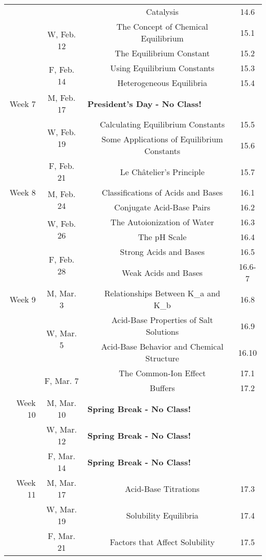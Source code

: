 \begin{tabular}{rcccc}
& & & Catalysis & 14.6\\
& \multirow{2}{*}{W, Feb. 12}& & The Concept of Chemical Equilibrium & 15.1\\
& & & The Equilibrium Constant & 15.2\\
& \multirow{2}{*}{F, Feb. 14}& & Using Equilibrium Constants & 15.3\\
& & & Heterogeneous Equilibria & 15.4\\
\midrule
Week 7 & M, Feb. 17& \multicolumn{3}{l}{\textbf{President's Day - No Class!}}\\
& \multirow{2}{*}{W, Feb. 19}& & Calculating Equilibrium Constants & 15.5\\
& & & Some Applications of Equilibrium Constants & 15.6\\
& F, Feb. 21&& Le Ch\^atelier's Principle & 15.7\\
\midrule
Week 8 & \multirow{2}{*}{M, Feb. 24}& & Classifications of Acids and Bases & 16.1\\
& & & Conjugate Acid-Base Pairs & 16.2\\
& \multirow{2}{*}{W, Feb. 26}& & The Autoionization of Water & 16.3\\
& & & The pH Scale & 16.4\\
& \multirow{2}{*}{F, Feb. 28}& & Strong Acids and Bases & 16.5\\
& & & Weak Acids and Bases & 16.6-7\\
\midrule
Week 9 & M, Mar. 3&& Relationships Between K_a and K_b & 16.8\\
& \multirow{2}{*}{W, Mar. 5}& & Acid-Base Properties of Salt Solutions & 16.9\\
& & & Acid-Base Behavior and Chemical Structure & 16.10\\
& \multirow{2}{*}{F, Mar. 7}& & The Common-Ion Effect & 17.1\\
& & & Buffers & 17.2\\
\midrule
Week 10 & M, Mar. 10& \multicolumn{3}{l}{\textbf{Spring Break - No Class!}}\\
& W, Mar. 12& \multicolumn{3}{l}{\textbf{Spring Break - No Class!}}\\
& F, Mar. 14& \multicolumn{3}{l}{\textbf{Spring Break - No Class!}}\\
\midrule
Week 11 & M, Mar. 17&& Acid-Base Titrations & 17.3\\
& W, Mar. 19&& Solubility Equilibria & 17.4\\
& \multirow{2}{*}{F, Mar. 21}& & Factors that Affect Solubility & 17.5\\

\end{tabular}
